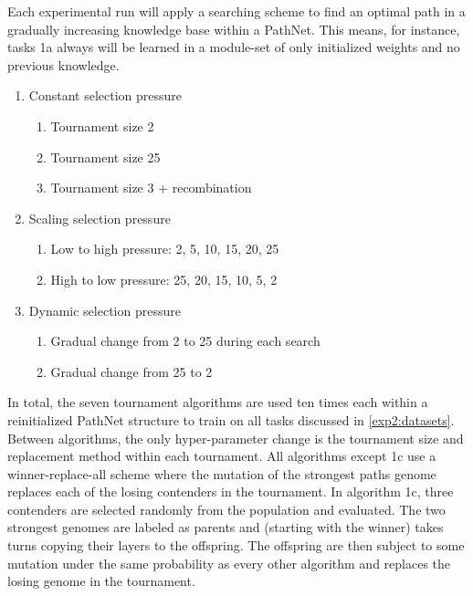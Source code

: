 Each experimental run will apply a searching scheme to find an optimal path in a gradually increasing knowledge base within a PathNet. This means, for instance, tasks 1a always will be learned in a module-set of only initialized weights and no previous knowledge. 
\begin{enumerate}
    \item Constant selection pressure
    \begin{enumerate}
        \item Tournament size 2
        \item Tournament size 25
        \item Tournament size 3 + recombination
    \end{enumerate}
    \item Scaling selection pressure
    \begin{enumerate}
        \item Low to high pressure: 2, 5, 10, 15, 20, 25
        \item High to low pressure: 25, 20, 15, 10, 5, 2
    \end{enumerate}
    \item Dynamic selection pressure
    \begin{enumerate}
        \item Gradual change from 2 to 25 during each search
        \item Gradual change from 25 to 2 
    \end{enumerate}
\end{enumerate}
In total, the seven tournament algorithms are used ten times each within a reinitialized PathNet structure to train on all tasks discussed in \ref{exp2:datasets}. Between algorithms, the only hyper-parameter change is the tournament size and replacement method within each tournament. All algorithms except 1c use a winner-replace-all scheme where the mutation of the strongest paths genome replaces each of the losing contenders in the tournament. In algorithm 1c, three contenders are selected randomly from the population and evaluated. The two strongest genomes are labeled as parents and (starting with the winner) takes turns copying their layers to the offspring. The offspring are then subject to some mutation under the same probability as every other algorithm and replaces the losing genome in the tournament.
